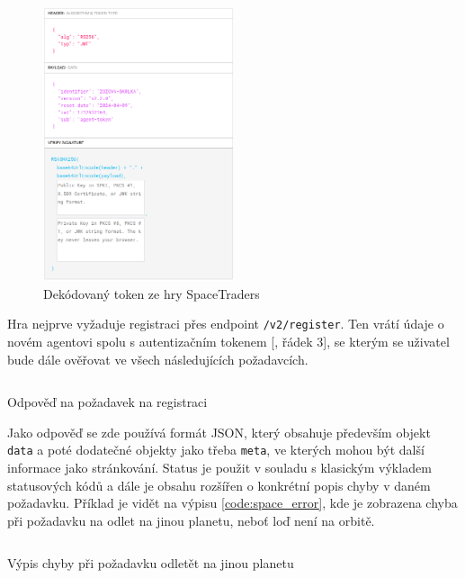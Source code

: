 \begin{figure}[!ht]
    \centering
    \includegraphics[width=0.5\textwidth]{figures/spaceTraders/jwt.png}
    \caption{Dekódovaný token ze hry SpaceTraders \cite[]{jwt_decoder}}
    \label{fig:jwt_spacetraders}
\end{figure}

Hra nejprve vyžaduje registraci přes endpoint \texttt{/v2/register}. Ten vrátí údaje o novém agentovi spolu s autentizačním tokenem [, řádek 3], se kterým se uživatel bude dále ověřovat ve všech následujících požadavcích.

\begin{listing}[!ht]
    \inputminted[breaklines]{json}{resources/code/spaceTraders/login.jsonc}
    \caption{Odpověď na požadavek na registraci\protect\footnotemark}
    \label{code:space_login}
\end{listing}

Jako odpověď se zde používá formát JSON, který obsahuje především objekt \texttt{data} a poté dodatečné objekty jako třeba \texttt{meta}, ve kterých mohou být další informace jako stránkování. %
Status je použit v souladu s klasickým výkladem statusových kódů %
a dále je obsahu rozšířen o konkrétní popis chyby v daném požadavku. Příklad je vidět na výpisu \ref{code:space_error}, kde je zobrazena chyba při požadavku na odlet na jinou planetu, neboť loď není na orbitě.


\begin{listing}[ht!]
    \inputminted[breaklines]{json}{resources/code/spaceTraders/error_response.jsonc}
    \caption{Výpis chyby při požadavku odletět na jinou planetu}
    \label{code:space_error}
\end{listing}

